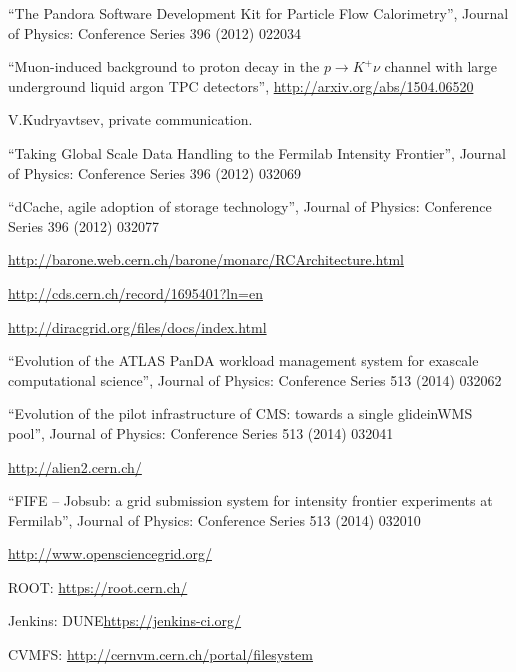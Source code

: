 \begin{thebibliography}{99}
 ``The Pandora Software Development Kit for Particle Flow Calorimetry'', Journal of Physics: Conference Series 396 (2012) 022034

 ``Muon-induced background to proton decay in the $p \rightarrow K^+\nu$ channel with large underground liquid argon TPC detectors'', \url{http://arxiv.org/abs/1504.06520}

 V.Kudryavtsev, private communication.

 ``Taking Global Scale Data Handling to the Fermilab Intensity Frontier'', Journal of Physics: Conference Series 396 (2012) 032069

 ``dCache, agile adoption of storage technology'', Journal of Physics: Conference Series 396 (2012) 032077

 \url{http://barone.web.cern.ch/barone/monarc/RCArchitecture.html}

 \url{http://cds.cern.ch/record/1695401?ln=en}

 \url{http://diracgrid.org/files/docs/index.html}

 ``Evolution of the ATLAS PanDA workload management system for exascale computational science'', Journal of Physics: Conference Series 513 (2014) 032062

 ``Evolution of the pilot infrastructure of CMS: towards a single glideinWMS pool'',  Journal of Physics: Conference Series 513 (2014) 032041

 \url{http://alien2.cern.ch/}

 ``FIFE -- Jobsub: a grid submission system for intensity frontier experiments at Fermilab'',  Journal of Physics: Conference Series 513 (2014) 032010

 \url{http://www.opensciencegrid.org/}

 ROOT: \url{https://root.cern.ch/}

 Jenkins: DUNE\url{https://jenkins-ci.org/}

 CVMFS: \url{http://cernvm.cern.ch/portal/filesystem}

\end{thebibliography}